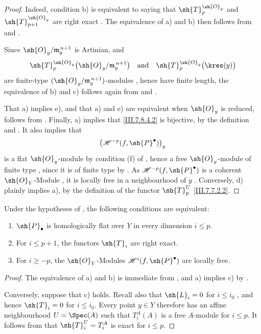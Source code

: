 \begin{proof}
Indeed, condition b) is equivalent to saying that
$\sh{T}_p^{\sh{O}_y}$ and $\sh{T}_{p+1}^{\sh{O}_y}$ are
right exact .  The equivalence of a) and b)
then follows from  and
.

Since $\sh{O}_y/\mathfrak m_y^{\,n+1}$ is Artinian, and
\[
  \sh{T}_p^{\sh{O}_y}
    \bigl(\sh{O}_y/\mathfrak m_y^{\,n+1}\bigr)
  \quad\hbox{and}\quad
  \sh{T}_p^{\sh{O}_y}\bigl(\kres(y)\bigr)
\]
are finite-type
$(\sh{O}_y/\mathfrak m_y^{\,n+1})$-modules
, hence have finite length, the equivalence
of b) and c) follows again from  and
.

That a) implies e), and that a) and e) are equivalent when
$\sh{O}_y$ is reduced, follows from .
Finally, a) implies that \eqref{III.7.8.4.2} is bijective,
by the definition  and
.  It also implies that
\[
  \bigl(\mathscr{H}^{-p}(f,\sh{P}^\bullet)\bigr)_y
\]
is a flat $\sh{O}_y$-module by condition (f) of
, hence a
free $\sh{O}_y$-module of finite type
, since it is of finite type by
.  As
$\mathscr{H}^{-p}(f,\sh{P}^\bullet)$ is a coherent
$\sh{O}_Y$-Module , it is locally free in
a neighbourhood of $y$ .
Conversely, d) plainly implies a), by the definition of the
functor $\sh{T}_p^U$ \eqref{III.7.7.2.2}.
\end{proof}

\begin{proposition}[7.8.5]
\label{III.7.8.5}
Under the hypotheses of , the following
conditions are equivalent:
\begin{enumerate}
  \item[a)] $\sh{P}_\bullet$ is homologically flat over $Y$
  in every dimension $i\leq p$.
  \item[b)] For $i\leq p+1$, the functors $\sh{T}_i$ are
  right exact.
  \item[c)] For $i\geq -p$, the $\sh{O}_Y$-Modules
  $\mathscr{H}^{i}(f,\sh{P}^\bullet)$ are locally free.
\end{enumerate}
\end{proposition}

\begin{proof}
The equivalence of a) and b) is immediate from
, and a) implies c) by
.

Conversely, suppose that c) holds.  Recall also that
$\sh{L}_i=0$ for $i\leq i_0$ , and hence
$\sh{T}_i=0$ for $i\leq i_0$.  Every point $y\in Y$
therefore has an affine neighbourhood
$U=\Spec(A)$ such that $T_i^A(A)$ is a free $A$-module for
$i\leq p$.  It follows from  that
$\sh{T}_i^U=T_i^A$ is exact for $i\leq p$.
\end{proof}

